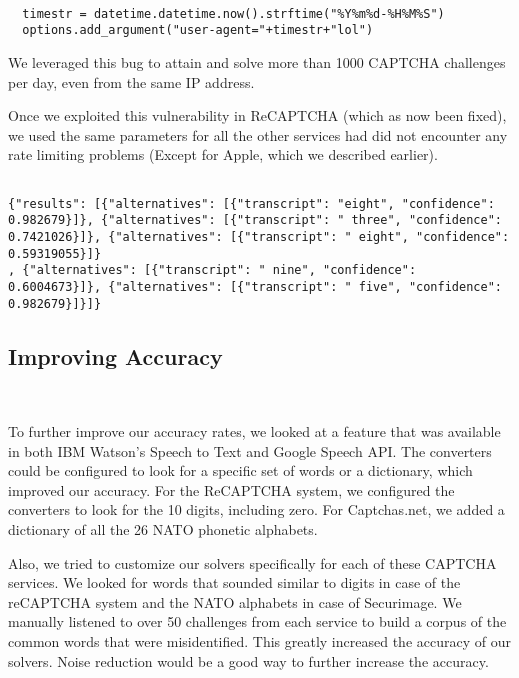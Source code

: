\begin{itemize}
    \begin{lstlisting}[caption={Generating unique User Agents with current time }, label={lst:listing3}]

  timestr = datetime.datetime.now().strftime("%Y%m%d-%H%M%S")
  options.add_argument("user-agent="+timestr+"lol")

\end{lstlisting}

We leveraged this bug to attain and solve more than 1000 CAPTCHA challenges per day, even from the same IP address. 

\end{itemize}

Once we exploited this vulnerability in ReCAPTCHA (which as now been fixed), we used the same parameters for all the other services had did not encounter any rate limiting problems (Except for Apple, which we described earlier).


\begin{lstlisting}[caption={Returned response from Google Speech Api for an acoustic captcha sample }, label={lst:listing4}]

{"results": [{"alternatives": [{"transcript": "eight", "confidence": 0.982679}]}, {"alternatives": [{"transcript": " three", "confidence": 0.7421026}]}, {"alternatives": [{"transcript": " eight", "confidence": 0.59319055}]}
, {"alternatives": [{"transcript": " nine", "confidence": 0.6004673}]}, {"alternatives": [{"transcript": " five", "confidence": 0.982679}]}]}

\end{lstlisting}


\subsection{Improving Accuracy}\mbox{}\
\label{accuracy}

To further improve our accuracy rates, we looked at a feature that was available in both IBM Watson's Speech to Text and Google Speech API. The converters could be configured to look for a specific set of words or a dictionary, which improved our accuracy. For the ReCAPTCHA system, we configured the converters to look for the 10 digits, including zero. For Captchas.net, we added a dictionary of all the 26 NATO phonetic alphabets.\newline

Also, we tried to customize our solvers specifically for each of these CAPTCHA services. We looked for words that sounded similar to digits in case of the reCAPTCHA system and the NATO alphabets in case of Securimage. We manually listened to over 50 challenges from each service to build a corpus of the common words that were misidentified. This greatly increased the accuracy of our solvers. Noise reduction would be a good way to further increase the accuracy.\newline
